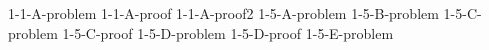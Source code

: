 \documentclass[uplatex, dvipdfmx, a4paper, 12pt, class=jsarticle, crop=false]{standalone}
\begin{document}
	{1-1-A-problem}
	{1-1-A-proof}
	{1-1-A-proof2}
	{1-5-A-problem}
	{1-5-B-problem}
	{1-5-C-problem}
	{1-5-C-proof}
	{1-5-D-problem}
 	{1-5-D-proof}
	{1-5-E-problem}
\end{document}
